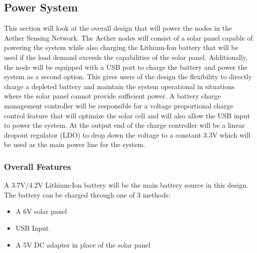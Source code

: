 \subsection{Power System}
This section will look at the overall design that will power the nodes in the Aether Sensing Network. The Aether nodes will consist of a solar panel capable of powering the system while also charging the Lithium-Ion battery that will be used if the load demand exceeds the capabilities of the solar panel. Additionally, the node will be equipped with a USB port to charge the battery and power the system as a second option. This gives users of the design the flexibility to directly charge a depleted battery and maintain the system operational in situations where the solar panel cannot provide sufficient power. A battery charge management controller will be responsible for a voltage proportional charge control feature that will optimize the solar cell and will also allow the USB input to power the system. At the output end of the charge controller will be a linear dropout regulator (LDO) to drop down the voltage to a constant 3.3V which will be used as the main power line for the system.

\subsubsection{Overall Features}
A 3.7V/4.2V Lithium-Ion battery will be the main battery source in this design. The battery can be charged through one of 3 methods:
\begin{itemize}
    \item A 6V solar panel
    \item USB Input
    \item A 5V DC adapter in place of the solar panel
\end{itemize}

